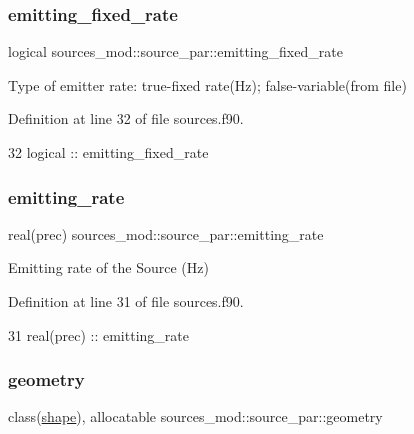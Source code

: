 \subsubsection{\texorpdfstring{emitting\+\_\+fixed\+\_\+rate}{emitting\_fixed\_rate}}
{\footnotesize\ttfamily logical sources\+\_\+mod\+::source\+\_\+par\+::emitting\+\_\+fixed\+\_\+rate\hspace{0.3cm}{\ttfamily [private]}}



Type of emitter rate\+: true-\/fixed rate(\+Hz); false-\/variable(from file) 



Definition at line 32 of file sources.\+f90.


\begin{DoxyCode}
32         \textcolor{keywordtype}{logical} :: emitting\_fixed\_rate
\end{DoxyCode}
\mbox{\label{structsources__mod_1_1source__par_a8374d8f2d32dfa9e9f5863c7a45d0e1d}} 
\subsubsection{\texorpdfstring{emitting\+\_\+rate}{emitting\_rate}}
{\footnotesize\ttfamily real(prec) sources\+\_\+mod\+::source\+\_\+par\+::emitting\+\_\+rate\hspace{0.3cm}{\ttfamily [private]}}



Emitting rate of the Source (Hz) 



Definition at line 31 of file sources.\+f90.


\begin{DoxyCode}
31         \textcolor{keywordtype}{real(prec)} :: emitting\_rate
\end{DoxyCode}
\mbox{\label{structsources__mod_1_1source__par_abf09d59fd65f02d1a8139e2f9f477207}} 
\subsubsection{\texorpdfstring{geometry}{geometry}}
{\footnotesize\ttfamily class(\mbox{\hyperlink{structgeometry__mod_1_1shape}{shape}}), allocatable sources\+\_\+mod\+::source\+\_\+par\+::geometry\hspace{0.3cm}{\ttfamily [private]}}



